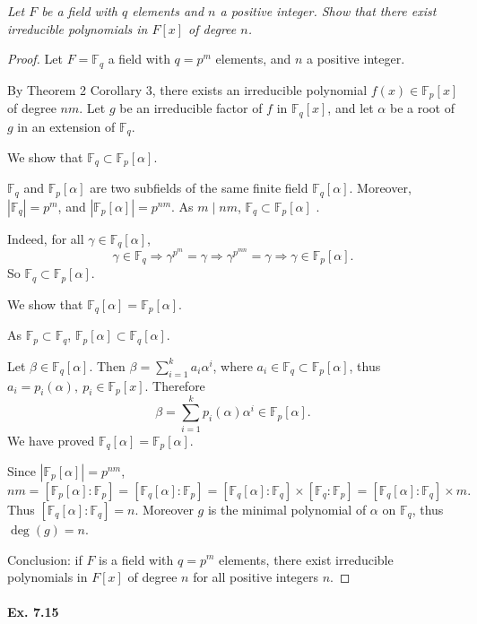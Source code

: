 \documentclass[11pt,a4paper]{article}
\newcommand{\F}{\mathbb{F}}
\begin{document}
{\it  Let $F$ be a field with $q$ elements and $n$ a positive integer. Show that there exist irreducible polynomials in $F[x]$ of degree $n$.
}

\begin{proof}
Let $F = \F_q$ a field with $q = p^m$ elements, and $n$ a positive integer.

By Theorem 2 Corollary 3, there exists an irreducible polynomial $f(x) \in \F_p[x]$ of degree $nm$. Let $g$ be an irreducible factor of $f$ in $\mathbb{F}_q[x]$, and let $\alpha$ be a root of $g$ in an extension of $\F_q$.

\bigskip

We show that $\F_q \subset \F_p[\alpha]$.

$\F_q$ and $\F_p[\alpha]$ are two subfields of the same finite field $\F_q[\alpha]$. Moreover, $|\F_q| = p^m$, and $|\F_p[\alpha]| = p^{nm} $. As $m\mid nm$, $\F_q \subset \F_p[\alpha]$ .

Indeed, for all  $\gamma \in \F_q[\alpha]$,$$ \gamma \in \F_q \Rightarrow  \gamma^{p^m} =  \gamma \Rightarrow  \gamma^{p^{mn}} =  \gamma \Rightarrow  \gamma \in \F_p[\alpha].$$
So $\F_q \subset \F_p[\alpha]$.

\bigskip

We show that $\F_q[\alpha] =  \F_p[\alpha]$.

As $\F_p \subset \F_q$, $\F_p[\alpha] \subset \F_q[\alpha]$.

Let $\beta \in \F_q[\alpha]$. Then $\beta = \sum\limits_{i=1}^k a_i\alpha^i$, where $a_i \in \F_q \subset \F_p[\alpha]$, thus $a_i = p_i(\alpha),\ p_i \in \F_p[x]$. Therefore
$$\beta = \sum\limits_{i=1}^k p_i(\alpha) \alpha^i \in \F_p[\alpha].$$
We have proved $\F_q[\alpha] =  \F_p[\alpha]$.

Since  $|\F_p[\alpha]| = p^{nm} $,
$$nm = [\mathbb{F}_p[\alpha] : \mathbb{F}_p] = [\mathbb{F}_q[\alpha]:\mathbb{F}_p] = [\mathbb{F}_q[\alpha] : \mathbb{F}_q]\times [\mathbb{F}_q:\mathbb{F}_p] =  [\mathbb{F}_q[\alpha] : \mathbb{F}_q]\times m .$$
Thus  $[\mathbb{F}_q[\alpha] : \mathbb{F}_q] = n$. Moreover $g$ is the minimal polynomial of $\alpha$ on $\F_q$, thus $\deg(g) = n$.

Conclusion: if $F$ is a field with $q = p^m$ elements, there exist irreducible polynomials in $F[x]$ of degree $n$ for all positive integers $n$.
\end{proof}

\paragraph{Ex. 7.15}
\end{document}
